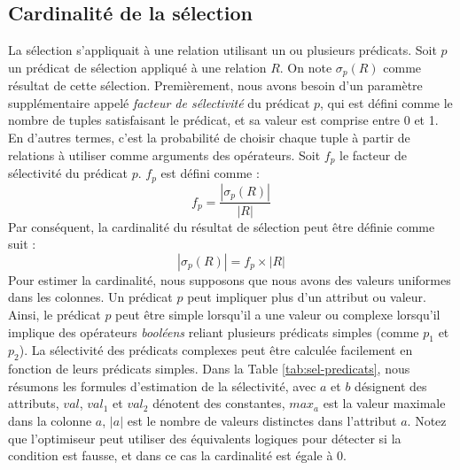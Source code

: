 \subsection{Cardinalité de la sélection}
La sélection s'appliquait à une relation utilisant un ou plusieurs prédicats. Soit $p$ un prédicat de sélection appliqué à une relation $R$. On note $\sigma_p(R)$ comme résultat de cette sélection. Premièrement, nous avons besoin d'un paramètre supplémentaire appelé \textit{facteur de sélectivité} du prédicat $p$, qui est défini comme le nombre de tuples satisfaisant le prédicat, et sa valeur est comprise entre 0 et 1. En d'autres termes, c'est la probabilité de choisir chaque tuple à partir de relations à utiliser comme arguments des opérateurs. Soit $f_p$ le facteur de sélectivité du prédicat $p$. $f_p$ est défini comme :
\begin{equation}
 f_p = \frac{|\sigma_p(R)|}{|R|}
\end{equation}
Par conséquent, la cardinalité du résultat de sélection peut être définie comme suit :
\begin{equation}
 |\sigma_p(R)| = f_p \times |R|
\end{equation}
Pour estimer la cardinalité, nous supposons que nous avons des valeurs uniformes dans les colonnes. Un prédicat $p$ peut impliquer plus d'un attribut ou valeur. Ainsi, le prédicat $p$ peut être simple lorsqu'il a une valeur ou complexe lorsqu'il implique des opérateurs \textit{booléens} reliant plusieurs prédicats simples (comme $p_1$ et $p_2$). La sélectivité des prédicats complexes peut être calculée facilement en fonction de leurs prédicats simples. Dans la Table \ref{tab:sel-predicats}, nous résumons les formules d'estimation de la sélectivité, avec $a$ et $b$ désignent des attributs, $val$, $val_1$ et $val_2$ dénotent des constantes, $max_a$ est la valeur maximale dans la colonne $a$, $|a|$ est le nombre de valeurs distinctes dans l'attribut $a$. Notez que l'optimiseur peut utiliser des équivalents logiques pour détecter si la condition est fausse, et dans ce cas la cardinalité est égale à 0.


